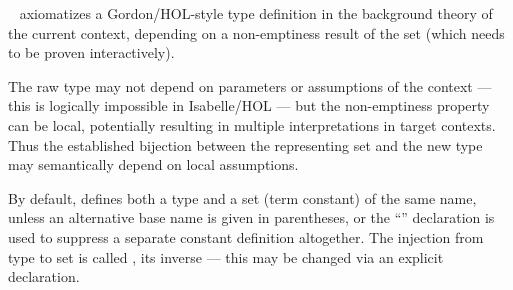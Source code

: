 \begin{isabellebody}
\begin{isamarkuptext}
  \begin{description}

  \item \hyperlink{command.HOL.typedef}{\mbox{}}~
  axiomatizes a Gordon/HOL-style type definition in the background
  theory of the current context, depending on a non-emptiness result
  of the set  (which needs to be proven interactively).

  The raw type may not depend on parameters or assumptions of the
  context --- this is logically impossible in Isabelle/HOL --- but the
  non-emptiness property can be local, potentially resulting in
  multiple interpretations in target contexts.  Thus the established
  bijection between the representing set  and the new type
   may semantically depend on local assumptions.

  By default, \hyperlink{command.HOL.typedef}{\mbox{}} defines both a type 
  and a set (term constant) of the same name, unless an alternative
  base name is given in parentheses, or the ``''
  declaration is used to suppress a separate constant definition
  altogether.  The injection from type to set is called ,
  its inverse  --- this may be changed via an explicit
  \hyperlink{keyword.HOL.morphisms}{\mbox{}} declaration.


\end{description}
\end{isamarkuptext}
\end{isabellebody}
